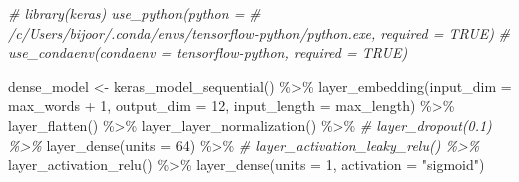 \documentclass[
]{article}
\newenvironment{Shaded}{}{}
\newcommand{\AttributeTok}[1]{\textcolor[rgb]{0.49,0.56,0.16}{#1}}
\newcommand{\CommentTok}[1]{\textcolor[rgb]{0.38,0.63,0.69}{\textit{#1}}}
\newcommand{\DecValTok}[1]{\textcolor[rgb]{0.25,0.63,0.44}{#1}}
\newcommand{\FunctionTok}[1]{\textcolor[rgb]{0.02,0.16,0.49}{#1}}
\newcommand{\NormalTok}[1]{#1}
\newcommand{\OtherTok}[1]{\textcolor[rgb]{0.00,0.44,0.13}{#1}}
\newcommand{\SpecialCharTok}[1]{\textcolor[rgb]{0.25,0.44,0.63}{#1}}
\newcommand{\StringTok}[1]{\textcolor[rgb]{0.25,0.44,0.63}{#1}}
\begin{document}
\begin{Shaded}
\begin{Highlighting}[]
\CommentTok{\# library(keras) use\_python(python =}
\CommentTok{\# \textquotesingle{}/c/Users/bijoor/.conda/envs/tensorflow{-}python/python.exe\textquotesingle{}, required = TRUE)}
\CommentTok{\# use\_condaenv(condaenv = \textquotesingle{}tensorflow{-}python\textquotesingle{}, required = TRUE)}

\NormalTok{dense\_model }\OtherTok{\textless{}{-}} \FunctionTok{keras\_model\_sequential}\NormalTok{() }\SpecialCharTok{\%\textgreater{}\%}
    \FunctionTok{layer\_embedding}\NormalTok{(}\AttributeTok{input\_dim =}\NormalTok{ max\_words }\SpecialCharTok{+} \DecValTok{1}\NormalTok{, }\AttributeTok{output\_dim =} \DecValTok{12}\NormalTok{, }\AttributeTok{input\_length =}\NormalTok{ max\_length) }\SpecialCharTok{\%\textgreater{}\%}
    \FunctionTok{layer\_flatten}\NormalTok{() }\SpecialCharTok{\%\textgreater{}\%}
    \FunctionTok{layer\_layer\_normalization}\NormalTok{() }\SpecialCharTok{\%\textgreater{}\%}
    \CommentTok{\# layer\_dropout(0.1) \%\textgreater{}\%}
\FunctionTok{layer\_dense}\NormalTok{(}\AttributeTok{units =} \DecValTok{64}\NormalTok{) }\SpecialCharTok{\%\textgreater{}\%}
    \CommentTok{\# layer\_activation\_leaky\_relu() \%\textgreater{}\%}
\FunctionTok{layer\_activation\_relu}\NormalTok{() }\SpecialCharTok{\%\textgreater{}\%}
    \FunctionTok{layer\_dense}\NormalTok{(}\AttributeTok{units =} \DecValTok{1}\NormalTok{, }\AttributeTok{activation =} \StringTok{"sigmoid"}\NormalTok{)}


\end{Highlighting}
\end{Shaded}
\end{document}

